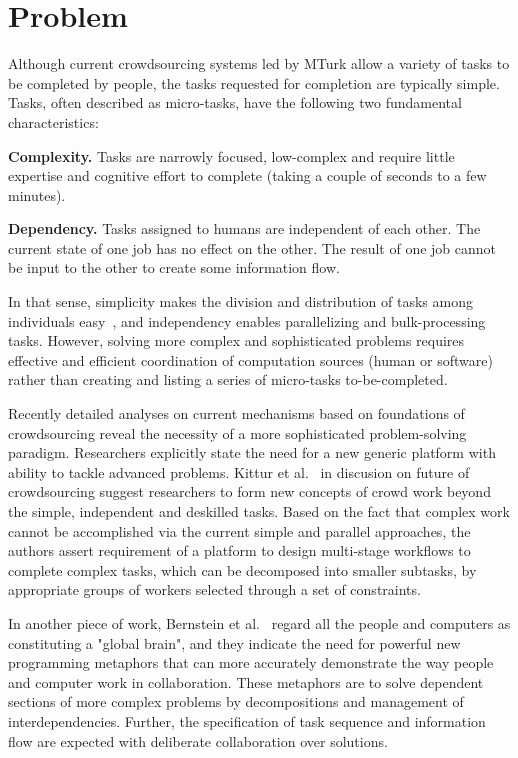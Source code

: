 \section{Problem}
\label{sec:problem}

Although current crowdsourcing systems led by MTurk allow a variety of tasks 
to be completed by people, the tasks requested for completion are typically simple. 
Tasks, often described as micro-tasks, have the following two fundamental characteristics:

\textbf{Complexity.} Tasks are narrowly focused, low-complex and require 
little expertise and cognitive effort to complete (taking a couple of seconds to 
a few minutes).

\textbf{Dependency.} Tasks assigned to humans are independent of each other. 
The current state of one job has no effect on the other. The result of one job cannot 
be input to the other to create some information flow.

In that sense, simplicity makes the division and distribution of tasks among 
individuals easy~\cite{Zhang2011}, and independency enables parallelizing 
and bulk-processing tasks. However, solving more complex and sophisticated 
problems requires effective and efficient coordination of computation sources 
(human or software) rather than creating and listing a series of micro-tasks 
to-be-completed.

Recently detailed analyses on current mechanisms based on foundations of 
crowdsourcing reveal the necessity of a more sophisticated problem-solving 
paradigm. Researchers explicitly state the need for a new generic platform 
with ability to tackle advanced problems. Kittur et al.~\cite{Kittur2013} in discusion on future of 
crowdsourcing suggest researchers to form new concepts of crowd work beyond 
the simple, independent and deskilled tasks. Based on the fact that complex 
work cannot be accomplished via the current simple and parallel approaches, 
the authors assert requirement of a platform to design multi-stage workflows 
to complete complex tasks, which can be decomposed into smaller subtasks, 
by appropriate groups of workers selected through a set of constraints.

In another piece of work, Bernstein et al.~\cite{Bernstein2012} regard all the 
people and computers as constituting a "global brain", and they indicate the 
need for powerful new programming metaphors that can more accurately 
demonstrate the way people and computer work in collaboration. These 
metaphors are to solve dependent sections of more complex problems by 
decompositions and management of interdependencies. Further, the specification 
of task sequence and information flow are expected with deliberate collaboration 
over solutions.

